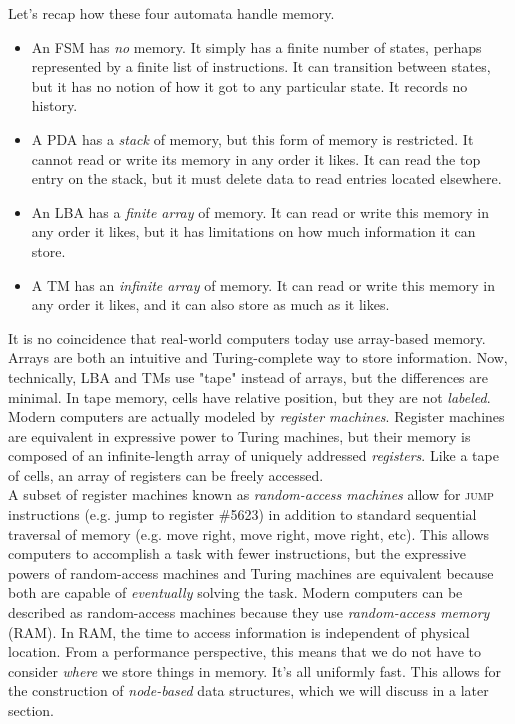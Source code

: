 Let's recap how these four automata handle memory.

\begin{itemize}
    \item An FSM has \textit{no} memory. It simply has a finite number of states, perhaps represented by a finite list of instructions. It can transition between states, but it has no notion of how it got to any particular state. It records no history.
    \item A PDA has a \textit{stack} of memory, but this form of memory is restricted. It cannot read or write its memory in any order it likes. It can read the top entry on the stack, but it must delete data to read entries located elsewhere.
    \item An LBA has a \textit{finite array} of memory. It can read or write this memory in any order it likes, but it has limitations on how much information it can store.
    \item A TM has an \textit{infinite array} of memory. It can read or write this memory in any order it likes, and it can also store as much as it likes.
\end{itemize}

It is no coincidence that real-world computers today use array-based memory. Arrays are both an intuitive and Turing-complete way to store information. Now, technically, LBA and TMs use "tape" instead of arrays, but the differences are minimal. In tape memory, cells have relative position, but they are not \textit{labeled}. Modern computers are actually modeled by \textit{register machines}. Register machines are equivalent in expressive power to Turing machines, but their memory is composed of an infinite-length array of uniquely addressed \textit{registers}. Like a tape of cells, an array of registers can be freely accessed. \\

A subset of register machines known as \textit{random-access machines} allow for \textsc{jump} instructions (e.g. jump to register \#5623) in addition to standard sequential traversal of memory (e.g. move right, move right, move right, etc). This allows computers to accomplish a task with fewer instructions, but the expressive powers of random-access machines and Turing machines are equivalent because both are capable of \textit{eventually} solving the task. Modern computers can be described as random-access machines because they use \textit{random-access memory} (RAM). In RAM, the time to access information is independent of physical location. From a performance perspective, this means that we do not have to consider \textit{where} we store things in memory. It's all uniformly fast. This allows for the construction of \textit{node-based} data structures, which we will discuss in a later section. \\\\


